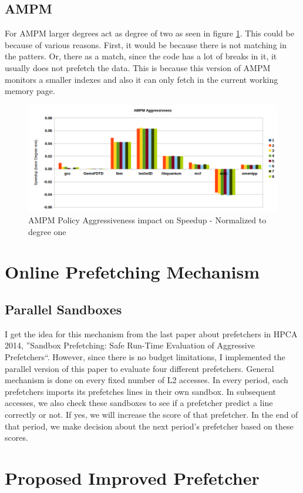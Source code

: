 \documentclass{article}
\begin{document}
\subsection{AMPM}
For AMPM larger degrees act as degree of two as seen in figure \ref{pic:ampm-agg}. This could be because of various reasons. First, it would be because there is not matching in the patters. Or, there as a match, since the code has a lot of breaks in it, it usually does not prefetch the data. This is because this version of AMPM monitors a smaller indexes and also it can only fetch in the current working memory page.

\begin{figure}[!h]
  \label{pic:ampm-agg}
  \centering
    \includegraphics[width=1\textwidth]{ampm_agg.png}
    \caption{AMPM Policy Aggressiveness impact on Speedup - Normalized to degree one}
\end{figure}

\section{Online Prefetching Mechanism}

\subsection{Parallel Sandboxes}
I get the idea for this mechanism from the last paper about prefetchers in HPCA 2014, ''Sandbox Prefetching: Safe Run-Time Evaluation of Aggressive Prefetchers``. However, since there is no budget limitations, I implemented the parallel version of this paper to evaluate four different prefetchers. General mechanism is done on every fixed number of L2 accesses. In every period, each prefetchers imports its prefetches lines in their own sandbox. In subsequent accesses, we also check these sandboxes to see if a prefetcher predict a line correctly or not. If yes, we will increase the score of that prefetcher. In the end of that period, we make decision about the next period's prefetcher based on these scores. 


\section{Proposed Improved Prefetcher}

% 
% 
% 
\end{document}
